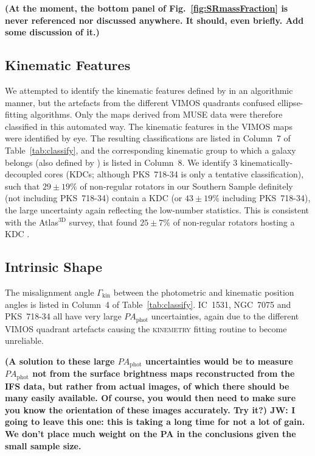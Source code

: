 \documentclass[a4paper,fleqn,usenatbib]{mnras}
\begin{document}
{\bf (At the moment, the bottom panel of Fig.~\ref{fig:SRmassFraction}
  is never referenced nor discussed anywhere. It should, even
  briefly. Add some discussion of it.)}

\subsection{Kinematic Features}
\label{subsec:kin_features}

We attempted to identify the kinematic features defined by
\citet{Krajnovic2011} in an algorithmic manner, but the artefacts from
the different VIMOS quadrants confused ellipse-fitting
algorithms. Only the maps derived from MUSE data were therefore
classified in this automated way. The kinematic features in the VIMOS
maps were identified by eye. The resulting classifications are listed
in Column~7 of Table~\ref{tab:classify}, and the corresponding
kinematic group to which a galaxy belongs (also defined by
\citealt{Krajnovic2011}) is listed in Column~8. We identify $3$
kinematically-decoupled cores (KDCs; although PKS~718-34 is only a
tentative classification), such that $29\pm19\%$ of non-regular
rotators in our Southern Sample definitely (not including PKS~718-34)
contain a KDC (or $43\pm19\%$ including PKS~718-34), the large
uncertainty again reflecting the low-number statistics. This is
consistent with the Atlas$^\text{3D}$ survey, that found $25\pm7\%$ of
non-regular rotators hosting a KDC \citep{Krajnovic2011}.

\subsection{Intrinsic Shape}
\label{subsec:int_shape}

The misalignment angle $\Gamma_\text{kin}$ between the photometric and
kinematic position angles is listed in Column~4 of
Table~\ref{tab:classify}. IC~1531, NGC~7075 and PKS~718-34 all have
very large $PA_\text{phot}$ uncertainties, again due to the different
VIMOS quadrant artefacts causing the \textsc{kinemetry} fitting
routine to become unreliable.

{\bf (A solution to these large $PA_\text{phot}$ uncertainties would
  be to measure $PA_\text{phot}$ not from the surface brightness maps
  reconstructed from the IFS data, but rather from actual images, of
  which there should be many easily available. Of course, you would
  then need to make sure you know the orientation of these images
  accurately. Try it?) JW: I going to leave this one: this is taking a long time for not a lot of gain. We don't place much weight on the PA in the conclusions given the small sample size.}
\end{document}
